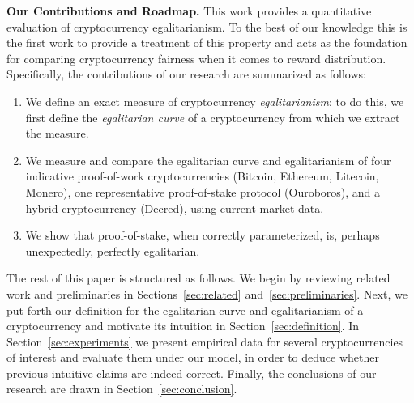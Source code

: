\textbf{Our Contributions and Roadmap.}
This work provides a quantitative evaluation of cryptocurrency egalitarianism.
To the best of our knowledge this is the first work to provide a
treatment of this property and acts as the foundation for comparing
cryptocurrency fairness when it comes to reward distribution.
Specifically, the contributions of our research are summarized as follows:

\begin{enumerate}
  \item We define an exact measure of cryptocurrency
        \emph{egalitarianism}; to do this, we first define the \emph{egalitarian curve} of a
        cryptocurrency from which we extract the measure.
  \item We measure and compare the egalitarian curve and egalitarianism of
        four indicative proof-of-work cryptocurrencies (Bitcoin, Ethereum,
        Litecoin, Monero), one representative proof-of-stake protocol (Ouroboros), and
        a hybrid cryptocurrency (Decred), using current market data.
  \item We show that proof-of-stake, when correctly parameterized, is, perhaps unexpectedly, perfectly
        egalitarian.
\end{enumerate}

The rest of this paper is structured as follows. We begin by reviewing related
work and preliminaries in Sections~\ref{sec:related}
and~\ref{sec:preliminaries}. Next, we put forth our definition for the
egalitarian curve and egalitarianism of a cryptocurrency and motivate its
intuition in Section~\ref{sec:definition}. In Section~\ref{sec:experiments} we
present empirical data for several cryptocurrencies of interest and evaluate
them under our model, in order to deduce whether
previous intuitive claims are indeed correct. Finally, the conclusions of our research
are drawn in Section~\ref{sec:conclusion}.
